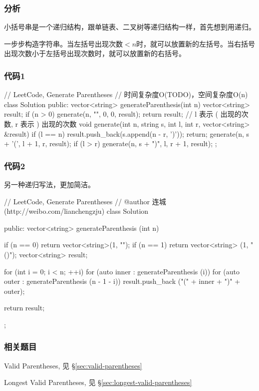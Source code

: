 \subsubsection{分析}
小括号串是一个递归结构，跟单链表、二叉树等递归结构一样，首先想到用递归。

一步步构造字符串。当左括号出现次数$<n$时，就可以放置新的左括号。当右括号出现次数小于左括号出现次数时，就可以放置新的右括号。


\subsubsection{代码1}
\begin{Code}
	// LeetCode, Generate Parentheses
	// 时间复杂度O(TODO)，空间复杂度O(n)
	class Solution {
		public:
		vector<string> generateParenthesis(int n) {
			vector<string> result;
			if (n > 0) generate(n, "", 0, 0, result);
			return result;
		}
		// l 表示 ( 出现的次数, r 表示 ) 出现的次数
		void generate(int n, string s, int l, int r, vector<string> &result) {
			if (l == n) {
				result.push_back(s.append(n - r, ')'));
				return;
			}
			generate(n, s + '(', l + 1, r, result);
			if (l > r) generate(n, s + ")", l, r + 1, result);
		}
	};
\end{Code}


\subsubsection{代码2}
另一种递归写法，更加简洁。
\begin{Code}
	// LeetCode, Generate Parentheses
	// @author 连城 (http://weibo.com/lianchengzju)
	class Solution {
		public:
		vector<string> generateParenthesis (int n) {
			if (n == 0) return vector<string>(1, "");
			if (n == 1) return vector<string> (1, "()");
			vector<string> result;
			
			for (int i = 0; i < n; ++i)
			for (auto inner : generateParenthesis (i))
			for (auto outer : generateParenthesis (n - 1 - i))
			result.push_back ("(" + inner + ")" + outer);
			
			return result;
		}
	};
\end{Code}


\subsubsection{相关题目}
\begindot
\item Valid Parentheses, 见 \S \ref{sec:valid-parentheses}
\item Longest Valid Parentheses, 见 \S \ref{sec:longest-valid-parentheses}
\myenddot


